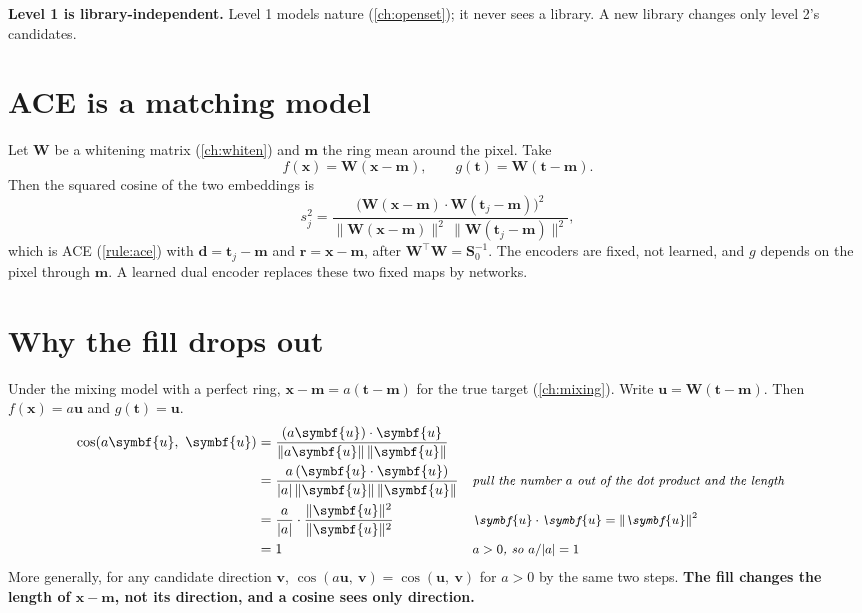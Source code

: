 \documentclass[11pt,a4paper,oneside,openany]{book}
\newcommand{\B}[1]{{\symbf{#1}}}
\newcommand{\B}[1]{{\bm{#1}}}
\newcommand{\T}{^{\top}}
\newcommand{\nrm}[1]{\lVert #1\rVert}
\newcommand{\vx}{\B{x}}
\newcommand{\vt}{\B{t}}
\newcommand{\vr}{\B{r}}
\newcommand{\vd}{\B{d}}
\newcommand{\vu}{\B{u}}
\newcommand{\vv}{\B{v}}
\newcommand{\vm}{\B{m}}
\newcommand{\mS}{\B{S}}
\newcommand{\mW}{\B{W}}
\newcommand{\why}[1]{&&\text{\small\itshape #1}}
\begin{document}
\textbf{Level 1 is library-independent.} Level 1 models nature (\cref{ch:openset}); it never sees a library. A new library changes only level 2's candidates.

\section{ACE is a matching model}

Let $\mW$ be a whitening matrix (\cref{ch:whiten}) and $\vm$ the ring mean around the pixel. Take
\[
  f(\vx)=\mW(\vx-\vm),\qquad g(\vt)=\mW(\vt-\vm) .
\]
Then the squared cosine of the two embeddings is
\[
  s_j^2=\frac{\big(\mW(\vx-\vm)\cdot\mW(\vt_j-\vm)\big)^2}{\nrm{\mW(\vx-\vm)}^2\,\nrm{\mW(\vt_j-\vm)}^2},
\]
which is ACE (\cref{rule:ace}) with $\vd=\vt_j-\vm$ and $\vr=\vx-\vm$, after $\mW\T\mW=\mS_0^{-1}$. The encoders are fixed, not learned, and $g$ depends on the pixel through $\vm$.
A learned dual encoder replaces these two fixed maps by networks.

\section{Why the fill drops out}

Under the mixing model with a perfect ring, $\vx-\vm=a(\vt-\vm)$ for the true target (\cref{ch:mixing}). Write $\vu=\mW(\vt-\vm)$. Then $f(\vx)=a\vu$ and $g(\vt)=\vu$.
\begin{align*}
\cos(a\vu,\ \vu) &= \frac{(a\vu)\cdot\vu}{\nrm{a\vu}\,\nrm{\vu}}\\
 &= \frac{a\,(\vu\cdot\vu)}{|a|\,\nrm{\vu}\,\nrm{\vu}} \why{pull the number $a$ out of the dot product and the length}\\
 &= \frac{a}{|a|}\cdot\frac{\nrm{\vu}^2}{\nrm{\vu}^2} \why{$\vu\cdot\vu=\nrm{\vu}^2$}\\
 &= 1 \why{$a>0$, so $a/|a|=1$}
\end{align*}
More generally, for any candidate direction $\vv$, $\cos(a\vu,\ \vv)=\cos(\vu,\ \vv)$ for $a>0$ by the same two steps. \textbf{The fill changes the length of $\vx-\vm$, not
its direction, and a cosine sees only direction.}
\end{document}
